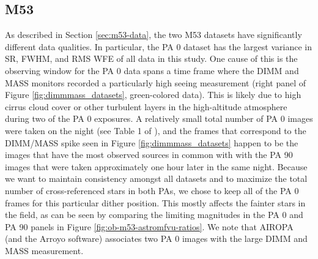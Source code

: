 \documentclass[]{spie}  %
\begin{document}
\subsection{M53} \label{sec:results-m53}
As described in Section \ref{sec:m53-data}, the two M53 datasets have significantly different data qualities. In particular, the PA 0 dataset has the largest variance in SR, FWHM, and RMS WFE of all data in this study. One cause of this is the observing window for the PA 0 data spans a time frame where the DIMM and MASS monitors recorded a particularly high seeing measurement (right panel of Figure \ref{fig:dimmmass_datasets}, green-colored data). This is likely due to high cirrus cloud cover or other turbulent layers in the high-altitude atmosphere during two of the PA 0 exposures. A relatively small total number of PA 0 images were taken on the night (see Table 1 of \cite{service:2016a}), and the frames that correspond to the DIMM/MASS spike seen in Figure \ref{fig:dimmmass_datasets} happen to be the images that have the most observed sources in common with with the PA 90 images that were taken approximately one hour later in the same night. Because we want to maintain consistency amongst all datasets and to maximize the total number of cross-referenced stars in both PAs, we chose to keep all of the PA 0 frames for this particular dither position. This mostly affects the fainter stars in the field, as can be seen by comparing the limiting magnitudes in the PA 0 and PA 90 panels in Figure \ref{fig:ob-m53-astromfvu-ratios}. We note that AIROPA (and the Arroyo software) associates two PA 0 images with the large DIMM and MASS measurement.
\end{document}
